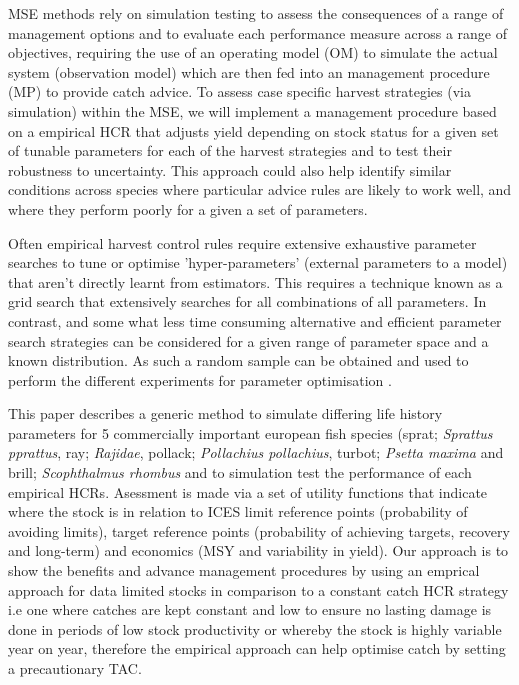 \documentclass[preprint,review,12pt]{elsarticle}
\begin{document}
MSE methods rely on simulation testing to assess the consequences of a range of management options and to evaluate each performance measure across a range of objectives, requiring the use of an operating model (OM) to simulate the actual system (observation model) which are then fed into an management procedure (MP) to provide catch advice. To assess case specific harvest strategies (via simulation) within the MSE, we will implement a management procedure based on a empirical HCR that adjusts yield depending on stock status for a given set of tunable parameters for each of the harvest strategies and to test their robustness to uncertainty.  This approach could also help identify similar conditions across species where particular advice rules are likely to work well, and where they perform poorly for a given a set of parameters. 

Often empirical harvest control rules require extensive exhaustive parameter searches to tune or optimise 'hyper-parameters' (external parameters to a model) that aren’t directly learnt from estimators.  This requires a technique known as a grid search that extensively searches for all combinations of all parameters. In contrast, and some what less time consuming alternative and efficient parameter search strategies can be considered for a given range of parameter space and a known distribution.  As such a random sample can be obtained and used to perform the different experiments for parameter optimisation \cite{bergstra2012random}. 

This paper describes a generic method to simulate differing life history parameters for 5 commercially important european fish species  (sprat; \emph{Sprattus pprattus}, ray; \emph{Rajidae}, pollack; \emph{Pollachius pollachius}, turbot; \emph{Psetta maxima} and brill; \emph{Scophthalmus rhombus} and to simulation test the performance of each empirical HCRs.  Asessment is made via a set of utility functions that indicate where the stock is in relation to ICES limit reference points (probability of avoiding limits), target reference points (probability of achieving targets, recovery and long-term) and economics  (MSY and variability in yield). Our approach is to show the benefits and advance management procedures by using an emprical approach for data limited stocks in comparison to a constant catch HCR strategy i.e one where catches are kept constant and low to ensure no lasting damage is done in periods of low stock productivity or whereby the stock is highly variable year on year, therefore the empirical approach can help optimise catch by setting a precautionary TAC. 
\end{document}
